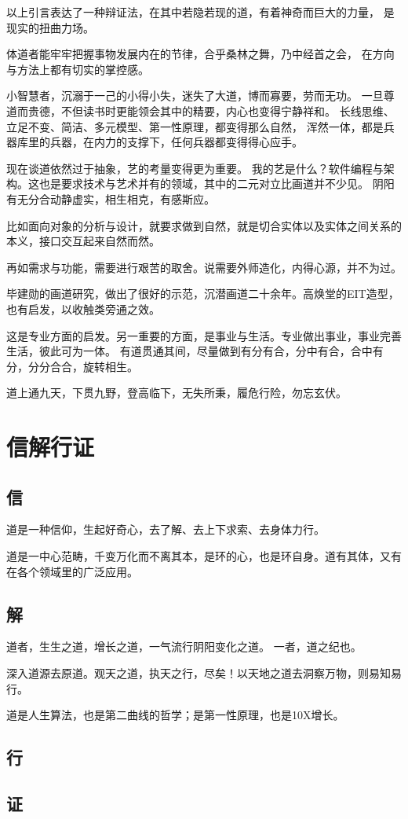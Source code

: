 以上引言表达了一种辩证法，在其中若隐若现的道，有着神奇而巨大的力量，
是现实的扭曲力场。

体道者能牢牢把握事物发展内在的节律，合乎桑林之舞，乃中经首之会，
在方向与方法上都有切实的掌控感。

小智慧者，沉溺于一己的小得小失，迷失了大道，博而寡要，劳而无功。
一旦尊道而贵德，不但读书时更能领会其中的精要，内心也变得宁静祥和。
长线思维、立足不变、简洁、多元模型、第一性原理，都变得那么自然，
浑然一体，都是兵器库里的兵器，在内力的支撑下，任何兵器都变得得心应手。

现在谈道依然过于抽象，艺的考量变得更为重要。
我的艺是什么？软件编程与架构。这也是要求技术与艺术并有的领域，其中的二元对立比画道并不少见。
阴阳有无分合动静虚实，相生相克，有感斯应。

比如面向对象的分析与设计，就要求做到自然，就是切合实体以及实体之间关系的本义，接口交互起来自然而然。

再如需求与功能，需要进行艰苦的取舍。说需要外师造化，内得心源，并不为过。

毕建勋的画道研究，做出了很好的示范，沉潜画道二十余年。高焕堂的EIT造型，也有启发，以收触类旁通之效。

这是专业方面的启发。另一重要的方面，是事业与生活。专业做出事业，事业完善生活，彼此可为一体。
有道贯通其间，尽量做到有分有合，分中有合，合中有分，分分合合，旋转相生。

道上通九天，下贯九野，登高临下，无失所秉，履危行险，勿忘玄伏。

\section{信解行证}

\subsection{信}

道是一种信仰，生起好奇心，去了解、去上下求索、去身体力行。

道是一中心范畴，千变万化而不离其本，是环的心，也是环自身。道有其体，又有在各个领域里的广泛应用。

\subsection{解}

道者，生生之道，增长之道，一气流行阴阳变化之道。
一者，道之纪也。

深入道源去原道。观天之道，执天之行，尽矣！以天地之道去洞察万物，则易知易行。

道是人生算法，也是第二曲线的哲学；是第一性原理，也是10X增长。

\subsection{行}

\subsection{证}
